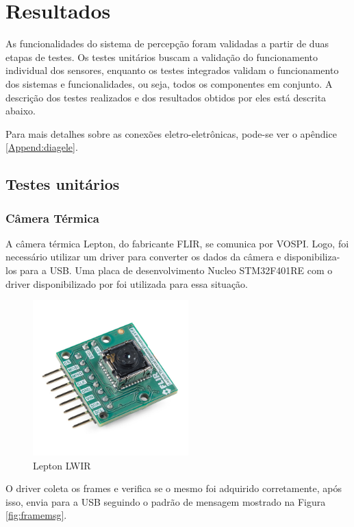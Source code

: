 \chapter{Resultados}
\label{chap:result}

As funcionalidades do sistema de percepção foram validadas a partir de duas etapas de testes. Os testes unitários buscam a validação do funcionamento individual dos sensores, enquanto os testes integrados validam o funcionamento dos sistemas e funcionalidades, ou seja, todos os componentes em conjunto. A descrição dos testes realizados e dos resultados obtidos por eles está descrita abaixo.

Para mais detalhes sobre as conexões eletro-eletrônicas, pode-se ver o apêndice \ref{Append:diagele}.

\section{Testes unitários}
\label{sec:testu}

	\subsection{Câmera Térmica}
	
		A câmera térmica Lepton, do fabricante FLIR, se comunica por VOSPI. Logo, foi necessário utilizar um driver para converter os dados da câmera e disponibiliza-los para a USB. Uma placa de desenvolvimento Nucleo STM32F401RE com o driver disponibilizado por  foi utilizada para essa situação.
		
		\begin{figure}[!ht]
		   \centering
		   \includegraphics[width=6cm]{Figures/lepton_flir.jpg}
		   \caption{Lepton LWIR}
		   \label{fig:lepton}
		\end{figure}
		
		O driver coleta os frames e verifica se o mesmo foi adquirido corretamente, após isso, envia para a USB seguindo o padrão de mensagem mostrado na Figura \ref{fig:framemsg}.
		    
